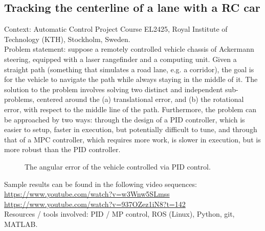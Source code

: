 \subsection{Tracking the centerline of a lane with a RC car}

Context: Automatic Control Project Course EL2425, Royal Institute of
Technology (KTH), Stockholm, Sweden.\\

Problem statement: suppose a remotely controlled vehicle chassis of Ackermann
steering, equipped with a laser rangefinder and a computing unit. Given a
straight path (something that simulates a road lane, e.g. a corridor), the goal
is for the vehicle to navigate the path while always staying in the middle of it.
The solution to the problem involves solving two distinct and independent
sub-problems, centered around the (a) translational error, and (b) the
rotational error, with respect to the middle line of the path. Furthermore, the
problem can be approached by two ways: through the design of a PID controller,
which is easier to setup, faster in execution, but potentially difficult to tune,
and through that of a MPC controller, which requires more work, is slower in
execution, but is more robust than the PID controller.

\begin{figure}[H]\centering
  \scalebox{0.6}{}
  \caption{The angular error of the vehicle controlled via PID control.}
  \label{fig:}
\end{figure}

Sample results can be found in the following video sequences:\\
\url{https://www.youtube.com/watch?v=w3Wnw5SLmss}\\
\url{https://www.youtube.com/watch?v=937OZez1iN8?t=142}\\

Resources / tools involved: PID / MP control, ROS (Linux), Python, git, MATLAB.
